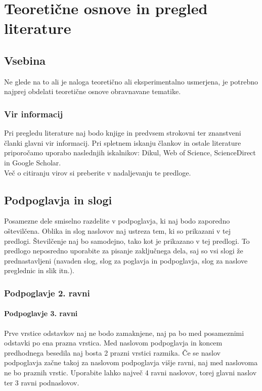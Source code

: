 \chapter{Teoretične osnove in pregled literature}\label{cha:teoreticne_osnove}

\section{Vsebina}\label{sec:vsebina}
Ne glede na to ali je naloga teoretično ali eksperimentalno usmerjena, je potrebno najprej obdelati teoretične osnove obravnavane tematike.

\subsection{Vir informacij}\label{sec:vir_informacij}
Pri pregledu literature naj bodo knjige in predvsem strokovni ter znanstveni članki glavni vir informacij. Pri spletnem iskanju člankov in ostale literature priporočamo uporabo naslednjih iskalnikov: Dikul, Web of Science, ScienceDirect in Google Scholar.\\

Več o citiranju virov si preberite v nadaljevanju te predloge.

\section{Podpoglavja in slogi}\label{sec:podpoglavja}
Posamezne dele smiselno razdelite v podpoglavja, ki naj bodo zaporedno oštevilčena. Oblika in slog naslovov naj ustreza tem, ki so prikazani v tej predlogi. Številčenje naj bo samodejno, tako kot je prikazano v tej predlogi. To predlogo neposredno uporabite za pisanje zaključnega dela, saj so vsi slogi že prednastavljeni (navaden slog, slog za poglavja in podpoglavja, slog za naslove preglednic in slik itn.).

\subsection{Podpoglavje 2. ravni}\label{sec:poglavje_2}
\subsubsection{Podpoglavje 3. ravni}\label{sec:poglavje_3}

Prve vrstice odstavkov naj ne bodo zamaknjene, naj pa bo med posameznimi odstavki po ena prazna vrstica. Med naslovom podpoglavja in koncem predhodnega besedila naj bosta 2 prazni vrstici razmika. Če se naslov podpoglavja začne takoj za naslovom podpoglavja višje ravni, naj med naslovoma ne bo praznih vrstic. Uporabite lahko največ 4 ravni naslovov, torej glavni naslov ter 3 ravni podnaslovov.\\

